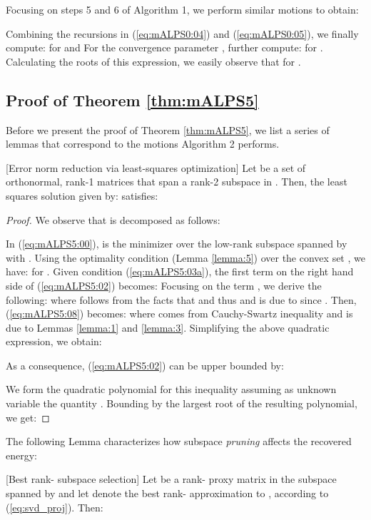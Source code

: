 \documentclass[twocolumn]{svjour3}
\begin{document}
Focusing on steps 5 and 6 of Algorithm 1, we perform similar motions to obtain:
 
Combining the recursions in (\ref{eq:mALPS0:04}) and (\ref{eq:mALPS0:05}), we finally compute:
 for  and 
 For the convergence parameter , further compute:
 for . Calculating the roots of this expression, we easily observe that  for . 




\subsection{Proof of Theorem \ref{thm:mALPS5}}

Before we present the proof of Theorem \ref{thm:mALPS5}, we list a series of lemmas that correspond to the motions Algorithm 2 performs.

\begin{lemma}{\label{lemma:greedy}}[Error norm reduction via least-squares optimization] Let  be a set of orthonormal, rank-1 matrices that span a rank-2 subspace in . Then, the least squares solution  given by:
 satisfies:

\end{lemma}

\begin{proof}
We observe that  is decomposed as follows:

In (\ref{eq:mALPS5:00}),  is the minimizer over the low-rank subspace spanned by  with . Using the optimality condition (Lemma \ref{lemma:5}) over the convex set , we have:
 for .
Given condition (\ref{eq:mALPS5:03a}), the first term on the right hand side of (\ref{eq:mALPS5:02}) becomes: 
 Focusing on the term , we derive the following:
 where  follows from the facts that  and thus  and  is due to  since . Then, (\ref{eq:mALPS5:08}) becomes:
 where  comes from Cauchy-Swartz inequality and  is due to Lemmas \ref{lemma:1} and \ref{lemma:3}. Simplifying the above quadratic expression, we obtain: 


As a consequence, (\ref{eq:mALPS5:02}) can be upper bounded by:


We form the quadratic polynomial for this inequality assuming as unknown variable the quantity . Bounding by the largest root of the resulting polynomial, we get:
 
\end{proof}

The following Lemma characterizes how subspace {\it pruning} affects the recovered energy:

\begin{lemma}{\label{lemma:comb_selection}}[Best rank- subspace selection] Let  be a rank- proxy matrix in the subspace spanned by  and let  denote the best rank- approximation to , according to (\ref{eq:svd_proj}). Then:

\end{lemma}
\end{document}
